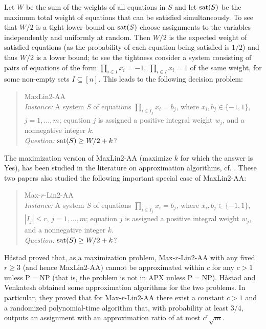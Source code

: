 \documentclass{llncs}
\begin{document}
Let $W$ be the sum of the weights of all equations in $S$
and let ${\rm sat}(S)$ be the maximum total weight of equations that can be satisfied simultaneously.
To see that $W/2$ is a tight lower bound on ${\rm sat}(S)$ choose assignments to the
variables independently and uniformly at random. Then $W/2$ is the expected weight of satisfied equations
(as the probability of each equation being satisfied is $1/2$) and thus $W/2$ is a lower bound; to see
the tightness consider a system consisting of pairs of equations
of the form $\prod_{i\in I}x_i=-1,\ \prod_{i\in I}x_i=1$ of the same weight, for some non-empty sets $I \subseteq [n]$.
This leads to the following decision problem:
 \begin{quote}
  {\sc MaxLin2-AA}\\ \nopagebreak
    \emph{Instance:} A system $S$ of equations $\prod_{i \in I_j}x_i = b_j$, where $x_i, b_j \in \{-1,1\}$, $j=1,\ldots ,m$;
equation $j$ is assigned a positive integral weight $w_j$, and a nonnegative integer $k$.\\
      \nopagebreak
    \emph{Question:} ${\rm sat}(S)\ge W/2 + k$?
  \end{quote}
The maximization version of {\sc MaxLin2-AA} (maximize $k$ for which the answer is {\sc Yes}),
has been studied in the literature on approximation algorithms, cf. \cite{Hastad01,HasVen04}.
These two papers also studied the following important special case of {\sc MaxLin2-AA}:
\begin{quote}
  {\sc Max-$r$-Lin2-AA}\\ \nopagebreak
    \emph{Instance:} A system $S$ of equations $\prod_{i \in I_j}x_i = b_j$, where $x_i, b_j \in \{-1,1\}$, $|I_j|\le r$,
$j=1,\ldots ,m$;
equation $j$ is assigned a positive integral weight $w_j$, and a nonnegative integer $k$.\\
      \nopagebreak
    \emph{Question:} ${\rm sat}(S)\ge W/2+k$?
  \end{quote}

H\aa stad \cite{Hastad01} proved that, as a maximization problem, {\sc Max-$r$-Lin2-AA} with any fixed $r\ge 3$
(and hence {\sc MaxLin2-AA}) cannot be approximated within $c$ for any $c>1$ unless P$=$NP (that is, the problem is not in APX unless P$=$NP).
H\aa stad and Venkatesh \cite{HasVen04} obtained some
approximation algorithms for the two problems. In particular, they proved that for {\sc Max-$r$-Lin2-AA} there exist a
constant $c>1$ and a randomized polynomial-time algorithm that, with probability at least 3/4, outputs an assignment
with an approximation ratio of at most $c^r\sqrt{m}.$
\end{document}
